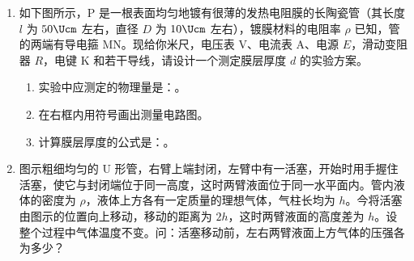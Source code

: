 \documentclass[\gkver]{gaokaozhenti}
\begin{document}
\begin{enumerate}
\item
如下图所示，P 是一根表面均匀地镀有很薄的发热电阻膜的长陶瓷管（其长度 $l$ 为 $50\Ucm$ 左右，直径 $D$ 为 $10\Ucm$ 左右），镀膜材料的电阻率 $\rho$ 已知，管的两端有导电箍 MN。现给你米尺，电压表 V、电流表 A、电源 $E$，滑动变阻器 $R$，电键 K 和若干导线，请设计一个测定膜层厚度 $d$ 的实验方案。
\begin{enumerate}
	\item
	实验中应测定的物理量是：。
	\item
	在右框内用符号画出测量电路图。
	\item
	计算膜层厚度的公式是：。
\end{enumerate}
\onepicture[align=right, w=4.36cm]{}

\item
图示粗细均匀的 U 形管，右臂上端封闭，左臂中有一活塞，开始时用手握住活塞，使它与封闭端位于同一高度，这时两臂液面位于同一水平面内。管内液体的密度为 $\rho$，液体上方各有一定质量的理想气体，气柱长均为 $h$。今将活塞由图示的位置向上移动，移动的距离为 $2h$，这时两臂液面的高度差为 $h$。设整个过程中气体温度不变。问：活塞移动前，左右两臂液面上方气体的压强各为多少？
\onepicture[align=right, h=5.03cm]{}
\end{enumerate}
\end{document}
